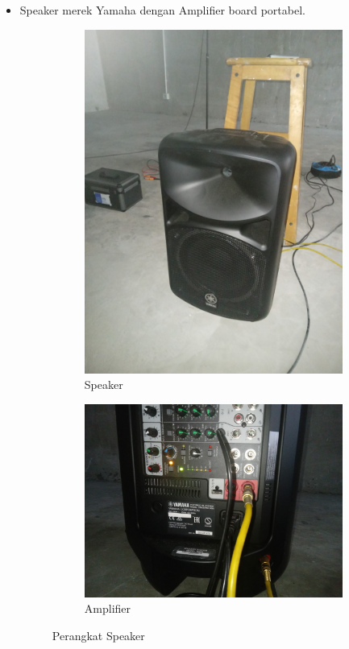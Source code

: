 \documentclass{article}
\begin{document}
	\begin{itemize}
		\item Speaker merek Yamaha dengan Amplifier board portabel.

		\begin{figure}[H]
			\centering
			\begin{subfigure}[]{.45\textwidth}
				\includegraphics[width=\textwidth,angle=-90]{images/tools_speaker}
				\caption{Speaker}
			\end{subfigure}
			\begin{subfigure}[]{.45\textwidth}
				\includegraphics[width=\textwidth]{images/tools_amplifier}
				\caption{Amplifier}
			\end{subfigure}
			\caption{Perangkat Speaker}
		\end{figure}


\end{itemize}
\end{document}
